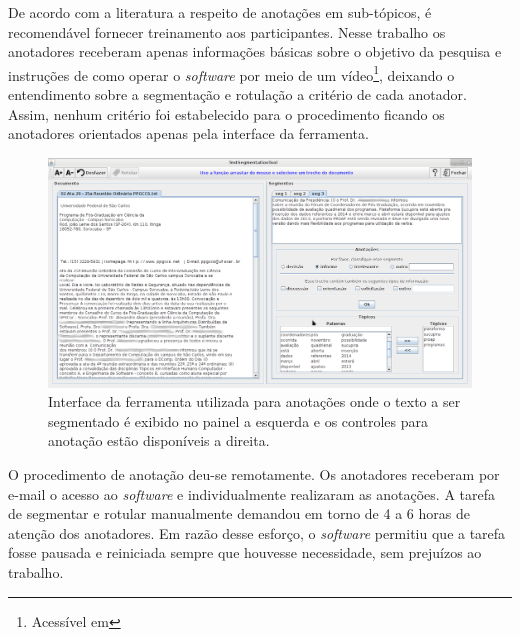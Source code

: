 De acordo com a literatura a respeito de anotações em sub-tópicos, é recomendável fornecer treinamento aos participantes. Nesse trabalho os anotadores receberam apenas informações básicas sobre o objetivo da pesquisa e instruções de como operar o \textit{software} por meio de um vídeo\footnote{Acessível em }, deixando o entendimento sobre a segmentação e rotulação a critério de cada anotador. Assim, nenhum critério foi estabelecido para o procedimento ficando os anotadores orientados apenas pela interface da ferramenta. 

  \begin{figure}[!h]
	  \centering
	  \includegraphics[width=1\textwidth]{conteudo/capitulos/figs/interface-TST.png}
	  \caption{Interface da ferramenta utilizada para anotações onde o texto a ser segmentado é exibido no painel a esquerda e os controles para anotação estão disponíveis a direita.}
	  \label{fig:interfaceanotacoes}
  \end{figure}



O procedimento de anotação deu-se remotamente. Os anotadores receberam por e-mail o acesso ao \textit{software} e individualmente realizaram as anotações. A tarefa de segmentar e rotular manualmente demandou em torno de 4 a 6 horas de atenção dos anotadores. Em razão desse esforço, o \textit{software} permitiu que a tarefa fosse pausada e reiniciada sempre que houvesse necessidade, sem prejuízos ao trabalho.

